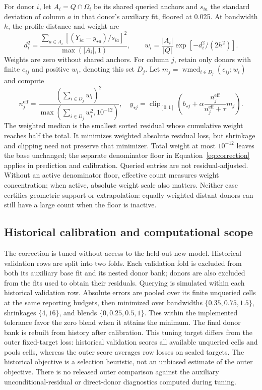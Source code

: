 \documentclass{article}
\newcommand{\clip}{\operatorname{clip}_{[0,1]}}
\begin{document}
For donor $i$, let $A_i=Q\cap\Omega_i$ be its shared queried anchors and $s_{ia}$ the standard deviation of column $a$ in that donor's auxiliary fit, floored at 0.025. At bandwidth $h$, the profile distance and weight are
\begin{equation}
 d_i^2=\frac{\sum_{a\in A_i}[(Y_{ia}-y_{\star a})/s_{ia}]^2}{\max(|A_i|,1)},\qquad
 w_i=\frac{|A_i|}{|Q|}\exp[-d_i^2/(2h^2)].
 \label{eq:weights}
\end{equation}
Weights are zero without shared anchors. For column $j$, retain only donors with finite $e_{ij}$ and positive $w_i$, denoting this set $D_j$. Let $m_j=\operatorname{wmed}_{i\in D_j}(e_{ij};w_i)$ and compute
\begin{equation}
 n_j^{\mathrm{eff}}=\frac{(\sum_{i\in D_j}w_i)^2}{\max(\sum_{i\in D_j}w_i^2,10^{-12})},\quad
 \widehat y_{\star j}=\clip\left(b_{\star j}+\alpha\frac{n_j^{\mathrm{eff}}}{n_j^{\mathrm{eff}}+\tau}m_j\right).
 \label{eq:correction}
\end{equation}
The weighted median is the smallest sorted residual whose cumulative weight reaches half the total. It minimizes weighted absolute residual loss, but shrinkage and clipping need not preserve that minimizer. Total weight at most $10^{-12}$ leaves the base unchanged; the separate denominator floor in Equation~\ref{eq:correction} applies in prediction and calibration. Queried entries are not residual-adjusted. Without an active denominator floor, effective count measures weight concentration; when active, absolute weight scale also matters. Neither case certifies geometric support or extrapolation: equally weighted distant donors can still have a large count when the floor is inactive.

\subsection{Historical calibration and computational scope}
The correction is tuned without access to the held-out new model. Historical validation rows are split into two folds. Each validation fold is excluded from both its auxiliary base fit and its nested donor bank; donors are also excluded from the fits used to obtain their residuals. Querying is simulated within each historical validation row. Absolute errors are pooled over its finite unqueried cells at the same reporting budgets, then minimized over bandwidths $\{0.35,0.75,1.5\}$, shrinkages $\{4,16\}$, and blends $\{0,0.25,0.5,1\}$. Ties within the implemented tolerance favor the zero blend when it attains the minimum. The final donor bank is rebuilt from history after calibration.
This tuning target differs from the outer fixed-target loss: historical validation scores all available unqueried cells and pools cells, whereas the outer score averages row losses on sealed targets. The historical objective is a selection heuristic, not an unbiased estimate of the outer objective. There is no released outer comparison against the auxiliary unconditional-residual or direct-donor diagnostics computed during tuning.
\end{document}
